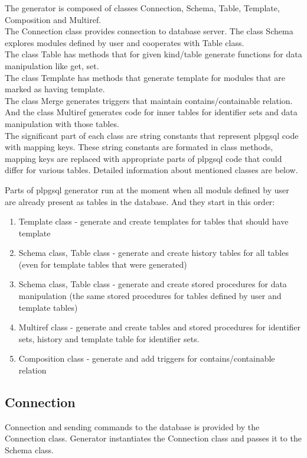 \documentclass[deska]{subfiles}
\begin{document}
The generator is composed of classes Connection, Schema, Table, Template, Composition and Multiref.\\
The Connection class provides connection to database server.
The class Schema explores modules defined by user and cooperates with Table class.\\
The class Table has methods that for given kind/table generate functions for data manipulation like get, set.\\
The class Template has methods that generate template for modules that are marked as having template.\\
The class Merge generates triggers that maintain contains/containable relation.\\
And the class Multiref generates code for inner tables for identifier sets and data manipulation with those tables.\\

The significant part of each class are string constants that represent plpgsql code with mapping keys. These string constants are formated in class methods, mapping keys are replaced with appropriate parts of plpgsql code that could differ for various tables.
Detailed information about mentioned classes are below.

Parts of plpgsql generator run at the moment when all moduls defined by user are already present as tables in the database. And they start in this order:

\begin{enumerate}
    \item Template class - generate and create templates for tables that should have template
    \item Schema class, Table class - generate and create history tables for all tables (even for template tables that were generated)
    \item Schema class, Table class - generate and create stored procedures for data manipulation (the same stored procedures for tables defined by user and template tables)
    \item Multiref class - generate and create tables and stored procedures for identifier sets, history and template table for identifier sets.
    \item Composition class - generate and add triggers for contains/containable relation
\end{enumerate}

\subsection{Connection}
Connection and sending commands to the database is provided by the Connection class. Generator instantiates the Connection class and passes it to the Schema class.
\end{document}
